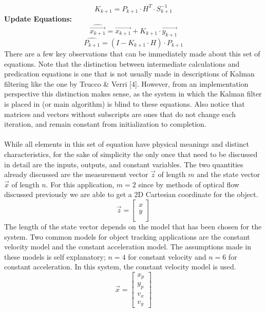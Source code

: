 \documentclass[12pt]{article} %
\begin{document}
\begin{equation}
K_{k+1} = P_{k+1} \cdot H^T \cdot S_{k+1}^{-1}
\end{equation}
\textbf{Update Equations:}
\begin{equation}
\hat{\vec{x_{k+1}}} = \vec{x_{k+1}} + K_{k+1} \cdot \vec{y_{k+1}}
\end{equation}
\begin{equation}
\hat{P_{k+1}} = (I - K_{k+1} \cdot H) \cdot P_{k+1}
\end{equation}
There are a few key observations that can be immediately made about this set of equations. Note that the distinction between intermediate calculations and predication equations is one that is not usually made in descriptions of Kalman filtering like the one by Trucco \& Verri [4]. However, from an implementation perspective this distinction makes sense, as the system in which the Kalman filter is placed in (or main algorithm) is blind to these equations. Also notice that matrices and vectors without subscripts are ones that do not change each iteration, and remain constant from initialization to completion. \\\\
While all elements in this set of equation have physical meanings and distinct characteristics, for the sake of simplicity the only once that need to be discussed in detail are the inputs, outputs, and constant variables. The two quantities already discussed are the measurement vector $\vec{z}$ of length $m$ and the state vector $\vec{x}$ of length $n$. For this application, $m = 2$ since by methods of optical flow discussed previously we are able to get a 2D Cartesian coordinate for the object.
\begin{equation}
\vec{z} = \begin{bmatrix}
x \\
y \\
\end{bmatrix}
\end{equation}
The length of the state vector depends on the model that has been chosen for the system. Two common models for object tracking applications are the constant velocity model and the constant acceleration model. The assumptions made in these models is self explanatory; $n=4$ for constant velocity and $n=6$ for constant acceleration. In this system, the constant velocity model is used.
\begin{equation}
 \vec{x} = \begin{bmatrix}
x_p \\
y_p \\
v_x \\
v_y
\end{bmatrix}
\end{equation}
\end{document}
